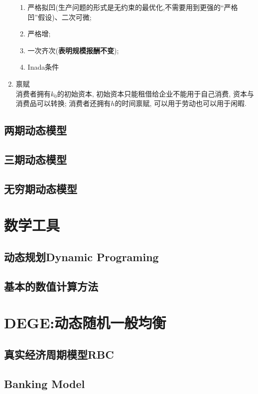 \documentclass[lang=cn,10pt]{elegantbook}
\begin{document}
\begin{enumerate}
\begin{enumerate}
        \item 严格拟凹(生产问题的形式是无约束的最优化,不需要用到更强的“严格凹”假设)、二次可微;
        \item 严格增;
        \item 一次齐次(\textbf{表明规模报酬不变});
        \item Inada条件
    \end{enumerate}
    \item 禀赋\\
    消费者拥有$k_0$的初始资本, 初始资本只能租借给企业不能用于自己消费, 资本与消费品可以转换; 消费者还拥有$h$的时间禀赋, 可以用于劳动也可以用于闲暇.
\end{enumerate}

\chapter{两期动态模型}
\newpage

\chapter{三期动态模型}
\newpage

\chapter{无穷期动态模型}
\newpage

\part{数学工具}
\chapter{动态规划Dynamic Programing}

\chapter{基本的数值计算方法}

\part{DEGE:动态随机一般均衡}
\chapter{真实经济周期模型RBC}

\chapter{Banking Model}
\end{document}
